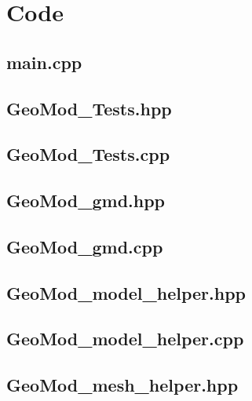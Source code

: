 \documentclass[a4paper, 12pt]{article}
\begin{document}
\newpage
\appendix
\section{Code} \label{sec:code}

\subsection{main.cpp} \label{subsec:main_cpp}


\subsection{GeoMod\_Tests.hpp} \label{subsec:Tests_hpp}

\subsection{GeoMod\_Tests.cpp} \label{subsec:Tests_cpp}


\subsection{GeoMod\_gmd.hpp} \label{subsec:gmd_hpp}

\subsection{GeoMod\_gmd.cpp} \label{subsec:gmd_cpp}


\subsection{GeoMod\_model\_helper.hpp} \label{subsec:model_hpp}

\subsection{GeoMod\_model\_helper.cpp} \label{subsec:model_cpp}


\subsection{GeoMod\_mesh\_helper.hpp} \label{subsec:mesh_hpp}

\end{document}
